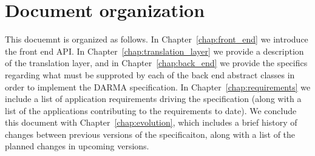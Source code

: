 





\section{Document organization}
\label{sec:organization}
This docuemnt is organized as follows.  In Chapter~\ref{chap:front_end} we
introduce the \gls{front end} \gls{API}.  In
Chapter~\ref{chap:translation_layer} we
provide a description of the \gls{translation layer}, and in
Chapter~\ref{chap:back_end} we provide the specifics regarding what must be
supproted by each of the \gls{back end} abstract classes in order to implement
the DARMA specification. In Chapter~\ref{chap:requirements} we include a list
of application requirements driving the specification (along with a list of the
    applications contributing to the requirements to date).
We conclude this document with
Chapter~\ref{chap:evolution}, which includes a brief history of changes between
previous versions of the specificaiton, along with a list of the planned changes 
in upcoming versions.


